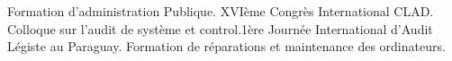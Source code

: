
\begin{scholarship}
			{Formation d’administration Publique. XVIème Congrès International CLAD.}
			{Colloque sur l’audit de système et control.1ère Journée International d’Audit Légiste au Paraguay.}
			{Formation de réparations et maintenance des ordinateurs.}
\end{scholarship}